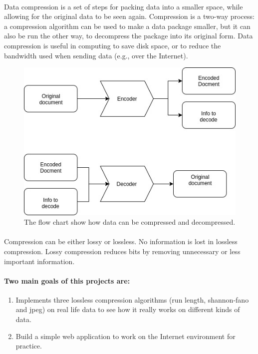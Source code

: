 \paragraph*{}
Data compression is a set of steps for packing data into a smaller space, while allowing for the original data to be seen again. Compression is a two-way process: a compression algorithm can be used to make a data package smaller, but it can also be run the other way, to decompress the package into its original form. Data compression is useful in computing to save disk space, or to reduce the bandwidth used when sending data (e.g., over the Internet).
\begin{figure}[h!]
\centering
\includegraphics[width=0.7\linewidth]{images/flow_chart.jpg}
\caption{The flow chart show how data can be compressed and decompressed.}
\end{figure}
\paragraph*{}
Compression can be either lossy or lossless. No information is lost in lossless compression. Lossy compression reduces bits by removing unnecessary or less important information.
\paragraph*{Two main goals of this projects are:}
\begin{enumerate}
\item Implements three lossless compression algorithms (run length, shannon-fano and jpeg) on real life data to see how it really works on different kinds of data.
\item Build a simple web application to work on the Internet environment for practice. 
\end{enumerate}

